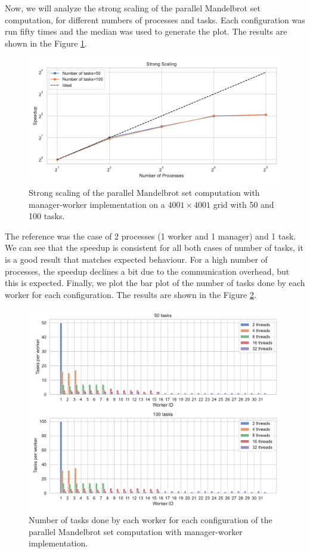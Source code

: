 \documentclass[unicode,11pt,a4paper,oneside,numbers=endperiod,openany]{scrartcl}
\begin{document}
Now, we will analyze the strong scaling of the parallel Mandelbrot set
computation, for different numbers of processes and tasks. Each configuration
was run fifty times and the median was used to generate the plot.
The results are shown in the Figure \ref{fig:mandelbrot}.
\begin{figure}[h!]
    \centering
    \includegraphics[width=\textwidth]{../hpc_python/ManagerWorker/strong_scaling_plot.pdf}
    \caption{Strong scaling of the parallel Mandelbrot set computation with
    manager-worker implementation on a $4001 \times 4001$ grid with 50 and 100 tasks.}
    \label{fig:mandelbrot}
\end{figure}
The reference was the case of 2 processes (1 worker and 1 manager) and 1 task.
We can see that the speedup is consistent for all both cases of number of tasks,
it is a good result that matches expected behaviour. For a high number of
processes, the speedup declines a bit due to the communication overhead, but
this is expected.
Finally, we plot the bar plot of the number of tasks done by each worker for
each configuration. The results are shown in the Figure \ref{fig:tasks}.
\begin{figure}[h!]
    \centering
    \includegraphics[width=\textwidth]{../hpc_python/ManagerWorker/tasks_per_worker.pdf}
    \caption{Number of tasks done by each worker for each configuration of the
    parallel Mandelbrot set computation with manager-worker implementation.}
    \label{fig:tasks}
\end{figure}
\end{document}
